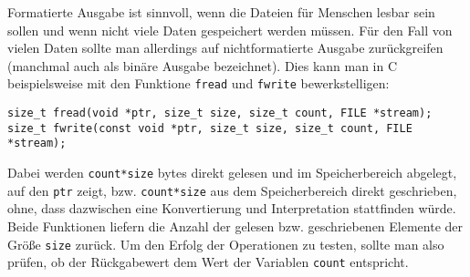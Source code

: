 Formatierte Ausgabe ist sinnvoll, wenn die Dateien für Menschen lesbar sein sollen und wenn nicht viele Daten gespeichert werden müssen.
Für den Fall von vielen Daten sollte man allerdings auf nichtformatierte Ausgabe zurückgreifen (manchmal auch als binäre Ausgabe bezeichnet).
Dies kann man in C beispielsweise mit den Funktione \texttt{fread} und \texttt{fwrite} bewerkstelligen:
\begin{lstlisting}
size_t fread(void *ptr, size_t size, size_t count, FILE *stream);
size_t fwrite(const void *ptr, size_t size, size_t count, FILE *stream);
\end{lstlisting}
Dabei werden \verb|count*size| bytes direkt gelesen und im Speicherbereich abgelegt, auf den \verb|ptr| zeigt, bzw. \verb|count*size| aus dem Speicherbereich direkt geschrieben, ohne, dass dazwischen eine Konvertierung und Interpretation stattfinden würde.
Beide Funktionen liefern die Anzahl der gelesen bzw. geschriebenen Elemente der Größe \verb|size| zurück.
Um den Erfolg der Operationen zu testen, sollte man also prüfen, ob der Rückgabewert dem Wert der Variablen \verb|count| entspricht.

